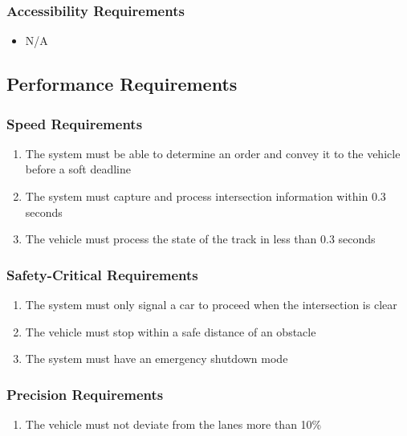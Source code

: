 \documentclass [11pt]{article}
\begin{document}
\subsubsection{Accessibility Requirements }
	\begin{itemize}
		\item N/A
	\end{itemize}
 
\subsection{Performance Requirements}

\subsubsection{Speed Requirements }
	\begin{enumerate}[label=\textbf{\Alph*}:]
		\item The system must be able to determine an order and convey it to the vehicle before a soft deadline
		\item The system must capture and process intersection information within 0.3 seconds
		\item The vehicle must process the state of the track in less than 0.3 seconds
	\end{enumerate}

\subsubsection{Safety-Critical Requirements }
	\begin{enumerate}[label=\textbf{\Alph*}:]
		\item The system must only signal a car to proceed when the intersection is clear
		\item The vehicle must stop within a safe distance of an obstacle
		\item The system must have an emergency shutdown mode
	\end{enumerate}	


\subsubsection{Precision Requirements}
	\begin{enumerate}[label=\textbf{\Alph*}:]
		\item The vehicle must not deviate from the lanes more than 10\%
	\end{enumerate}
\end{document}
